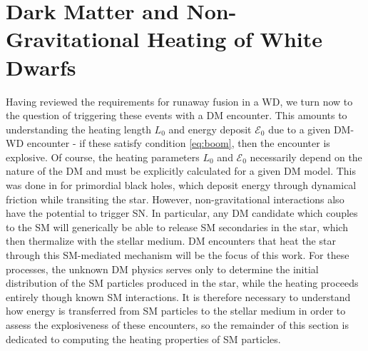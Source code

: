 \documentclass[twocolumn,showpacs,preprintnumbers,amsmath,amssymb,prd]{revtex4}
\newcommand{\Ez}{\mathcal{E}_0}
\begin{document}
\section{Dark Matter and Non-Gravitational Heating of White Dwarfs}
\label{sec:SMHeating}

Having reviewed the requirements for runaway fusion in a WD, we turn now to the question of triggering these events with a DM encounter. 
This amounts to understanding the heating length $L_0$ and energy deposit $\Ez$ due to a given DM-WD encounter - if these satisfy condition \eqref{eq:boom}, then the encounter is explosive.
Of course, the heating parameters $L_0$ and $\Ez$ necessarily depend on the nature of the DM and must be explicitly calculated for a given DM model. 
This was done in \cite{Graham:2015apa} for primordial black holes, which deposit energy through dynamical friction while transiting the star.
However, non-gravitational interactions also have the potential to trigger SN. 
In particular, any DM candidate which couples to the SM will generically be able to release SM secondaries in the star, which then thermalize with the stellar medium. 
DM encounters that heat the star through this SM-mediated mechanism will be the focus of this work. 
For these processes, the unknown DM physics serves only to determine the initial distribution of the SM particles produced in the star, while the heating proceeds entirely though known SM interactions. 
It is therefore necessary to understand how energy is transferred from SM particles to the stellar medium in order to assess the explosiveness of these encounters, so the remainder of this section is dedicated to computing the heating properties of SM particles.
\end{document}
